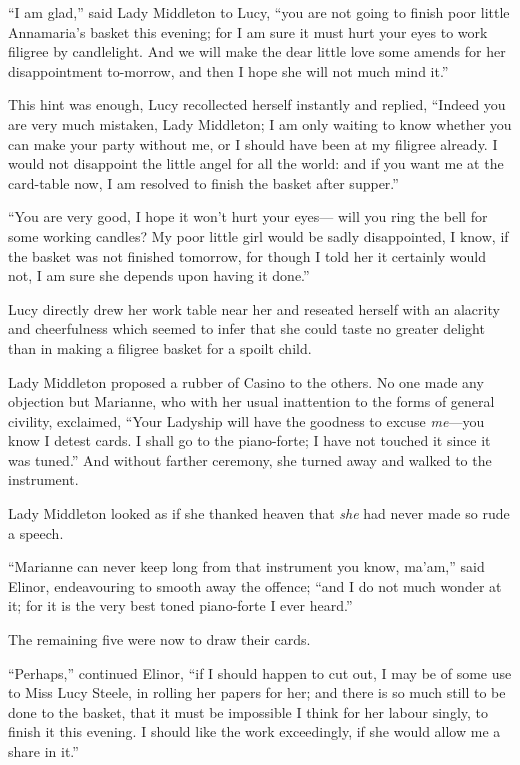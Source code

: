 \documentclass{article}
\begin{document}
``I am glad,'' said Lady Middleton to Lucy,
``you are not going to finish poor little Annamaria's
basket this evening; for I am sure it must hurt your
eyes to work filigree by candlelight.  And we will make
the dear little love some amends for her disappointment
to-morrow, and then I hope she will not much mind it.''

This hint was enough, Lucy recollected herself instantly
and replied, ``Indeed you are very much mistaken,
Lady Middleton; I am only waiting to know whether you can
make your party without me, or I should have been at my
filigree already.  I would not disappoint the little angel
for all the world: and if you want me at the card-table now,
I am resolved to finish the basket after supper.''

``You are very good, I hope it won't hurt your eyes---%
will you ring the bell for some working candles?
My poor little girl would be sadly disappointed, I know,
if the basket was not finished tomorrow, for though I
told her it certainly would not, I am sure she depends
upon having it done.''

Lucy directly drew her work table near her
and reseated herself with an alacrity and cheerfulness
which seemed to infer that she could taste no greater
delight than in making a filigree basket for a spoilt child.

Lady Middleton proposed a rubber of Casino to the others.
No one made any objection but Marianne, who with her usual
inattention to the forms of general civility, exclaimed,
``Your Ladyship will have the goodness to excuse \emph{me}---you
know I detest cards.  I shall go to the piano-forte;
I have not touched it since it was tuned.''  And without
farther ceremony, she turned away and walked to the instrument.

Lady Middleton looked as if she thanked heaven
that \emph{she} had never made so rude a speech.

``Marianne can never keep long from that instrument
you know, ma'am,'' said Elinor, endeavouring to smooth
away the offence; ``and I do not much wonder at it; for it
is the very best toned piano-forte I ever heard.''

The remaining five were now to draw their cards.

``Perhaps,'' continued Elinor, ``if I should happen
to cut out, I may be of some use to Miss Lucy Steele,
in rolling her papers for her; and there is so much still
to be done to the basket, that it must be impossible
I think for her labour singly, to finish it this evening.
I should like the work exceedingly, if she would allow
me a share in it.''
\end{document}
